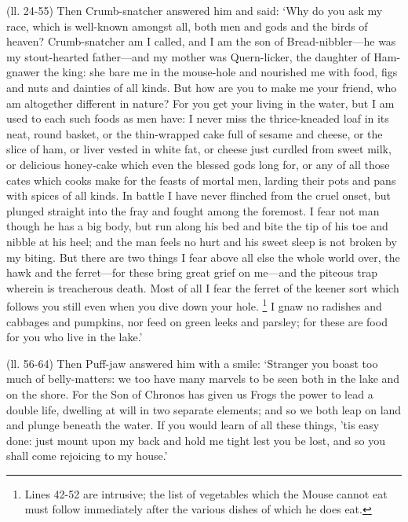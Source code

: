 (ll. 24-55) Then Crumb-snatcher answered him and said: ‘Why do you ask my
race, which is well-known amongst all, both men and gods and the birds of
heaven? Crumb-snatcher am I called, and I am the son of Bread-nibbler—he
was my stout-hearted father—and my mother was Quern-licker, the daughter
of Ham-gnawer the king: she bare me in the mouse-hole and nourished me with
food, figs and nuts and dainties of all kinds. But how are you to make me your
friend, who am altogether different in nature? For you get your living in the
water, but I am used to each such foods as men have: I never miss the
thrice-kneaded loaf in its neat, round basket, or the thin-wrapped cake full of
sesame and cheese, or the slice of ham, or liver vested in white fat, or cheese
just curdled from sweet milk, or delicious honey-cake which even the blessed
gods long for, or any of all those cates which cooks make for the feasts of
mortal men, larding their pots and pans with spices of all kinds. In battle I
have never flinched from the cruel onset, but plunged straight into the fray
and fought among the foremost. I fear not man though he has a big body, but run
along his bed and bite the tip of his toe and nibble at his heel; and the man
feels no hurt and his sweet sleep is not broken by my biting. But there are two
things I fear above all else the whole world over, the hawk and the
ferret—for these bring great grief on me—and the piteous trap
wherein is treacherous death. Most of all I fear the ferret of the keener sort
which follows you still even when you dive down your hole. \footnote{Lines 42-52 are intrusive;
the list of vegetables which the Mouse cannot eat must follow immediately after
the various dishes of which he does eat.} I gnaw no radishes and cabbages
and pumpkins, nor feed on green leeks and parsley; for these are food for you
who live in the lake.’

(ll. 56-64) Then Puff-jaw answered him with a smile: ‘Stranger you boast
too much of belly-matters: we too have many marvels to be seen both in the lake
and on the shore. For the Son of Chronos has given us Frogs the power to lead a
double life, dwelling at will in two separate elements; and so we both leap on
land and plunge beneath the water. If you would learn of all these things,
’tis easy done: just mount upon my back and hold me tight lest you be
lost, and so you shall come rejoicing to my house.’

